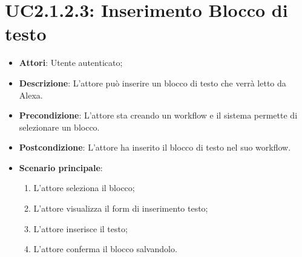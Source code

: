 \section{UC2.1.2.3: Inserimento Blocco di testo}
\label{UC2.1.2.3}
\begin{itemize}
	\item \textbf{Attori}: Utente autenticato;
	\item \textbf{Descrizione}: L'attore può inserire un blocco di testo che verrà letto da Alexa.
	\item \textbf{Precondizione}: L'attore sta creando un workflow e il sistema permette di selezionare un blocco.
	\item \textbf{Postcondizione}: L'attore ha inserito il blocco di testo nel suo workflow.
	\item \textbf{Scenario principale}:
	\begin{enumerate} \item L'attore seleziona il blocco; \item L'attore visualizza il form di inserimento testo; \item  L'attore inserisce il testo; \item L'attore conferma il blocco salvandolo.\end{enumerate}
\end{itemize}

